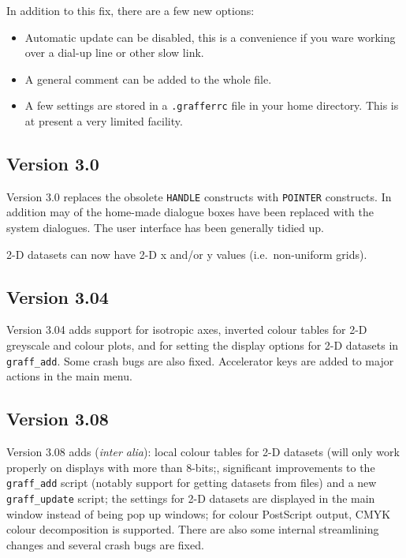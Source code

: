 \documentclass[11pt,twoside,english]{article}
\begin{document}
In addition to this fix, there are a few new options:

\begin{itemize}
\item Automatic update can be disabled, this is a convenience if you
  ware working over a dial-up line or other slow link.
\item A general comment can be added to the whole file.
\item A few settings are stored in a \texttt{.grafferrc} file in your
  home directory. This is at present a very limited facility.
\end{itemize}


\subsection{Version 3.0}
\label{sec:v3.00}

Version 3.0 replaces the obsolete \texttt{HANDLE} constructs with
\texttt{POINTER} constructs. In addition may of the home-made dialogue
boxes have been replaced with the system dialogues. The user interface
has been generally tidied up.

2-D datasets can now have 2-D x and/or y values (i.e.\ non-uniform
grids).

\subsection{Version 3.04}
\label{sec:v3.04}

Version 3.04 adds support for isotropic axes, inverted colour tables
for 2-D greyscale and colour plots, and for setting the display options
for 2-D datasets in \texttt{graff\_add}. Some crash bugs are also
fixed. Accelerator keys are added to major actions in the main menu.

\subsection{Version 3.08}
\label{sec:v308}

Version 3.08 adds (\textit{inter alia}): local colour tables for 2-D
datasets (will only work properly on displays with more than 8-bits;,
significant improvements to the \texttt{graff\_add} script (notably
support for getting datasets from files) and a new
\texttt{graff\_update} script; the settings for 2-D datasets are
displayed in the main window instead of being pop up windows; for
colour PostScript output, CMYK colour decomposition is supported. There
are also some internal streamlining changes and several crash bugs are
fixed.
\end{document}
